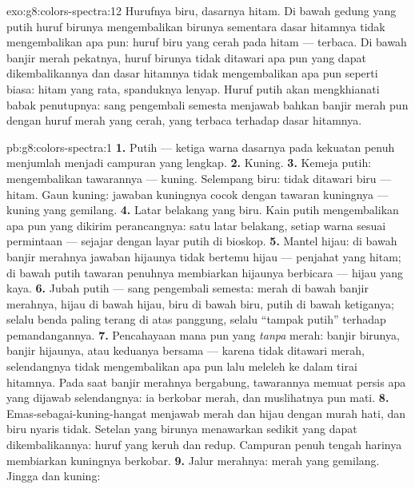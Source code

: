 \begin{solution}{exo:g8:colors-spectra:12}
Hurufnya biru, dasarnya hitam. Di bawah  gedung yang putih huruf
birunya mengembalikan birunya sementara dasar hitamnya tidak
mengembalikan apa pun: huruf biru yang cerah pada hitam --- terbaca.
Di bawah banjir merah pekatnya, huruf birunya tidak ditawari apa pun
yang dapat dikembalikannya dan dasar hitamnya tidak mengembalikan apa
pun seperti biasa: hitam yang rata, spanduknya lenyap. Huruf putih
akan mengkhianati babak penutupnya: sang pengembali semesta menjawab
bahkan banjir merah pun dengan huruf merah yang cerah, yang terbaca
terhadap dasar hitamnya.
\end{solution}

\begin{solution}{pb:g8:colors-spectra:1}
\textbf{1.} Putih --- ketiga warna dasarnya pada kekuatan penuh
menjumlah menjadi campuran yang lengkap.
\textbf{2.} Kuning.
\textbf{3.} Kemeja putih: mengembalikan tawarannya --- kuning.
Selempang biru: tidak ditawari biru --- hitam. Gaun kuning: jawaban
kuningnya cocok dengan tawaran kuningnya --- kuning yang gemilang.
\textbf{4.} Latar belakang yang biru. Kain putih mengembalikan apa pun
yang dikirim perancangnya: satu latar belakang, setiap warna sesuai
permintaan --- sejajar dengan layar putih di bioskop.
\textbf{5.} Mantel hijau: di bawah banjir merahnya jawaban hijaunya
tidak bertemu hijau --- penjahat yang hitam; di bawah  putih
tawaran penuhnya membiarkan hijaunya berbicara --- hijau yang kaya.
\textbf{6.} Jubah putih --- sang pengembali semesta: merah di bawah
banjir merahnya, hijau di bawah hijau, biru di bawah biru, putih di
bawah ketiganya; selalu benda paling terang di atas panggung, selalu
``tampak putih'' terhadap pemandangannya.
\textbf{7.} Pencahayaan mana pun yang \emph{tanpa} merah: banjir
birunya, banjir hijaunya, atau keduanya bersama --- karena tidak
ditawari merah, selendangnya tidak mengembalikan apa pun lalu meleleh
ke dalam tirai hitamnya. Pada saat banjir merahnya bergabung,
tawarannya memuat persis apa yang dijawab selendangnya: ia berkobar
merah, dan muslihatnya pun mati.
\textbf{8.} Emas-sebagai-kuning-hangat menjawab merah dan hijau dengan
murah hati, dan biru nyaris tidak. Setelan yang  birunya
menawarkan sedikit yang dapat dikembalikannya: huruf yang keruh dan
redup. Campuran penuh tengah harinya membiarkan kuningnya berkobar.
\textbf{9.} Jalur merahnya: merah yang gemilang. Jingga dan kuning:

\end{solution}
